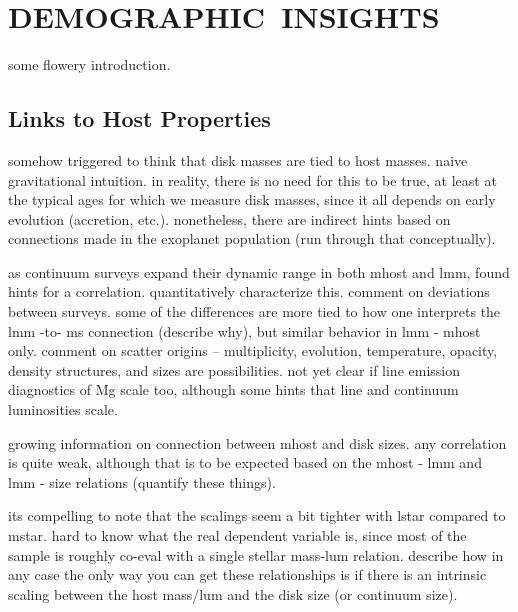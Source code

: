 \documentclass[a4paper]{ar-1col}
\begin{document}





\section{DEMOGRAPHIC\ INSIGHTS} \label{sec:demographics}
some flowery introduction.


\subsection{Links to Host Properties}
somehow triggered to think that disk masses are tied to host masses.  naive gravitational intuition.  in reality, there is no need for this to be true, at least at the typical ages for which we measure disk masses, since it all depends on early evolution (accretion, etc.).  nonetheless, there are indirect hints based on connections made in the exoplanet population (run through that conceptually).

as continuum surveys expand their dynamic range in both mhost and lmm, found hints for a correlation.  quantitatively characterize this.  comment on deviations between surveys.  some of the differences are more tied to how one interprets the lmm -to- ms connection (describe why), but similar behavior in lmm - mhost only.  comment on scatter origins -- multiplicity, evolution, temperature, opacity, density structures, and sizes are possibilities.  not yet clear if line emission diagnostics of Mg scale too, although some hints that line and continuum luminosities scale.

growing information on connection between mhost and disk sizes.  any correlation is quite weak, although that is to be expected based on the mhost - lmm and lmm - size relations (quantify these things).  

its compelling to note that the scalings seem a bit tighter with lstar compared to mstar.  hard to know what the real dependent variable is, since most of the sample is roughly co-eval with a single stellar mass-lum relation.  describe how in any case the only way you can get these relationships is if there is an intrinsic scaling between the host mass/lum and the disk size (or continuum size).  
\end{document}

